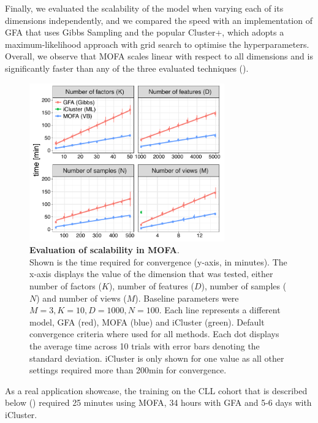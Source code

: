 Finally, we evaluated the scalability of the model when varying each of its dimensions independently, and we compared the speed with an implementation of GFA that uses Gibbs Sampling \cite{Leppaaho2017} and the popular Cluster+\cite{Mo2013}, which adopts a maximum-likelihood approach with grid search to optimise the hyperparameters. Overall, we observe that MOFA scales linear with respect to all dimensions and is significantly faster than any of the three evaluated techniques ().

\begin{figure}[H]
	\centering 	
	\includegraphics[width=0.75\textwidth]{MOFA_scalability}
	\caption{\textbf{Evaluation of scalability in MOFA}.\\
	Shown is the time required for convergence (y-axis, in minutes). The x-axis displays the value of the dimension that was tested, either number of factors ($K$), number of features ($D$), number of samples ($N$) and number of views ($M$). Baseline parameters were $M=3, K=10, D=1000, N=100$. Each line represents a different model, GFA (red), MOFA (blue) and iCluster (green). Default convergence criteria where used for all methods. Each dot displays the average time across 10 trials with error bars denoting the standard deviation. iCluster is only shown for one value as all other settings required more than 200min for convergence.
	}
	\label{fig:MOFA_scalability}
\end{figure}

As a real application showcase, the training on the CLL cohort that is described below () required 25 minutes using MOFA, 34 hours with GFA and 5-6 days with iCluster.



